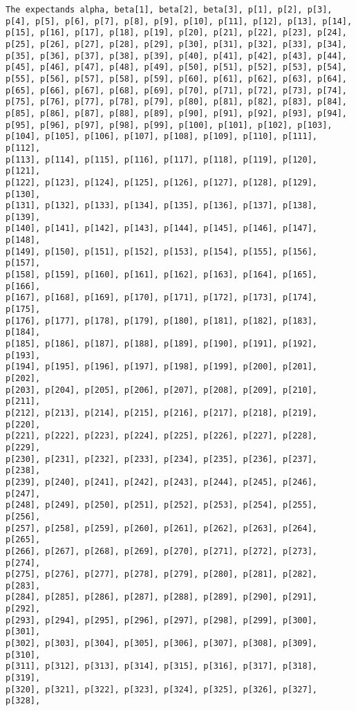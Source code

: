 \documentclass[
  letterpaper,
  DIV=11,
  numbers=noendperiod]{scrartcl}
\begin{document}
\begin{verbatim}
The expectands alpha, beta[1], beta[2], beta[3], p[1], p[2], p[3],
p[4], p[5], p[6], p[7], p[8], p[9], p[10], p[11], p[12], p[13], p[14],
p[15], p[16], p[17], p[18], p[19], p[20], p[21], p[22], p[23], p[24],
p[25], p[26], p[27], p[28], p[29], p[30], p[31], p[32], p[33], p[34],
p[35], p[36], p[37], p[38], p[39], p[40], p[41], p[42], p[43], p[44],
p[45], p[46], p[47], p[48], p[49], p[50], p[51], p[52], p[53], p[54],
p[55], p[56], p[57], p[58], p[59], p[60], p[61], p[62], p[63], p[64],
p[65], p[66], p[67], p[68], p[69], p[70], p[71], p[72], p[73], p[74],
p[75], p[76], p[77], p[78], p[79], p[80], p[81], p[82], p[83], p[84],
p[85], p[86], p[87], p[88], p[89], p[90], p[91], p[92], p[93], p[94],
p[95], p[96], p[97], p[98], p[99], p[100], p[101], p[102], p[103],
p[104], p[105], p[106], p[107], p[108], p[109], p[110], p[111], p[112],
p[113], p[114], p[115], p[116], p[117], p[118], p[119], p[120], p[121],
p[122], p[123], p[124], p[125], p[126], p[127], p[128], p[129], p[130],
p[131], p[132], p[133], p[134], p[135], p[136], p[137], p[138], p[139],
p[140], p[141], p[142], p[143], p[144], p[145], p[146], p[147], p[148],
p[149], p[150], p[151], p[152], p[153], p[154], p[155], p[156], p[157],
p[158], p[159], p[160], p[161], p[162], p[163], p[164], p[165], p[166],
p[167], p[168], p[169], p[170], p[171], p[172], p[173], p[174], p[175],
p[176], p[177], p[178], p[179], p[180], p[181], p[182], p[183], p[184],
p[185], p[186], p[187], p[188], p[189], p[190], p[191], p[192], p[193],
p[194], p[195], p[196], p[197], p[198], p[199], p[200], p[201], p[202],
p[203], p[204], p[205], p[206], p[207], p[208], p[209], p[210], p[211],
p[212], p[213], p[214], p[215], p[216], p[217], p[218], p[219], p[220],
p[221], p[222], p[223], p[224], p[225], p[226], p[227], p[228], p[229],
p[230], p[231], p[232], p[233], p[234], p[235], p[236], p[237], p[238],
p[239], p[240], p[241], p[242], p[243], p[244], p[245], p[246], p[247],
p[248], p[249], p[250], p[251], p[252], p[253], p[254], p[255], p[256],
p[257], p[258], p[259], p[260], p[261], p[262], p[263], p[264], p[265],
p[266], p[267], p[268], p[269], p[270], p[271], p[272], p[273], p[274],
p[275], p[276], p[277], p[278], p[279], p[280], p[281], p[282], p[283],
p[284], p[285], p[286], p[287], p[288], p[289], p[290], p[291], p[292],
p[293], p[294], p[295], p[296], p[297], p[298], p[299], p[300], p[301],
p[302], p[303], p[304], p[305], p[306], p[307], p[308], p[309], p[310],
p[311], p[312], p[313], p[314], p[315], p[316], p[317], p[318], p[319],
p[320], p[321], p[322], p[323], p[324], p[325], p[326], p[327], p[328],

\end{verbatim}
\end{document}
